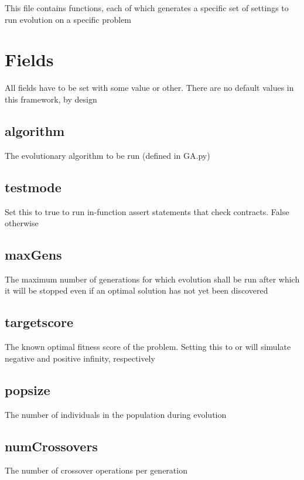 \documentclass[letterpaper,10pt,english]{sphinxmanual}
\begin{document}
This file contains functions, each of which generates a specific set of settings to run evolution on a specific problem


\section{Fields}
\label{settings.py:fields}
All fields have to be set with some value or other. There are no default values in this framework, by design


\subsection{algorithm}
\label{settings.py:algorithm}
The evolutionary algorithm to be run (defined in GA.py)


\subsection{testmode}
\label{settings.py:testmode}
Set this to true to run in-function assert statements that check contracts. False otherwise


\subsection{maxGens}
\label{settings.py:maxgens}
The maximum number of generations for which evolution shall be run after which it will be stopped even if an optimal solution has not yet been discovered


\subsection{targetscore}
\label{settings.py:targetscore}
The known optimal fitness score of the problem. Setting this to  or  will simulate negative and positive infinity, respectively


\subsection{popsize}
\label{settings.py:popsize}
The number of individuals in the population during evolution


\subsection{numCrossovers}
\label{settings.py:numcrossovers}
The number of crossover operations per generation
\end{document}
